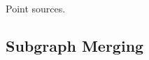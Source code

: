 \documentclass{aastex61}
\begin{document}
Point sources.

\subsection{Subgraph Merging}

\newpage




\end{document}
